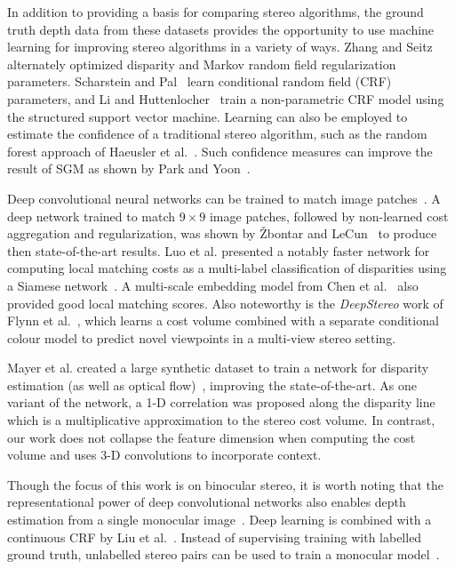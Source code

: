 In addition to providing a basis for comparing stereo algorithms, the ground truth depth data from these datasets provides the opportunity to use machine learning for improving stereo algorithms in a variety of ways.  Zhang and Seitz~\citep{Zhang2007} alternately optimized disparity and Markov random field regularization parameters.  Scharstein and Pal~\citep{Scharstein2007} learn conditional random field (CRF) parameters, and Li and Huttenlocher~\citep{Li2008} train a non-parametric CRF model using the structured support vector machine.  Learning can also be employed to estimate the confidence of a traditional stereo algorithm, such as the random forest approach of Haeusler et al.~\citep{Haeusler2013a}.  Such confidence measures can improve the result of SGM as shown by Park and Yoon~\citep{Park2015}.

Deep convolutional neural networks can be trained to match image patches~\citep{Zagoruyko2015}.  A deep network trained to match $9 \times 9$ image patches, followed by non-learned cost aggregation and regularization, was shown by {\v Z}bontar and LeCun~\citep{zbontar2015computing,zbontar2016stereo} to produce then state-of-the-art results.  Luo et al. presented a notably faster network for computing local matching costs as a multi-label classification of disparities using a Siamese network~\citep{luo2016efficient}.  A multi-scale embedding model from Chen et al.~\citep{chen2015deep} also provided good local matching scores.  Also noteworthy is the \emph{DeepStereo} work of Flynn et al.~\citep{Flynn2016}, which learns a cost volume combined with a separate conditional colour model to predict novel viewpoints in a multi-view stereo setting.

Mayer et al. created a large synthetic dataset to train a network for disparity estimation (as well as optical flow)~\citep{MIFDB16}, improving the state-of-the-art. As one variant of the network, a 1-D correlation was proposed along the disparity line which is a multiplicative approximation to the stereo cost volume. In contrast, our work does not collapse the feature dimension when computing the cost volume and uses 3-D convolutions to incorporate context.

Though the focus of this work is on binocular stereo, it is worth noting that the representational power of deep convolutional networks also enables depth estimation from a single monocular image~\citep{eigen2014depth}.  Deep learning is combined with a continuous CRF by Liu et al.~\citep{Liu2015}.  Instead of supervising training with labelled ground truth, unlabelled stereo pairs can be used to train a monocular model~\citep{garg2016unsupervised}.

